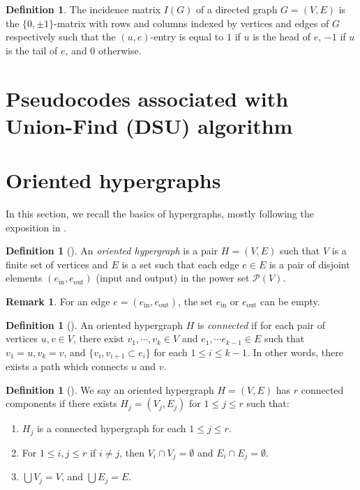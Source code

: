 \documentclass{article}
\theoremstyle{definition}
\newtheorem{definition}[theorem]{Definition}
\newtheorem{remark}[theorem]{Remark}
\begin{document}
\begin{definition}
The incidence matrix $I(G)$ of a directed graph $G=(V, E)$ is the $\{0, \pm 1\}$-matrix with rows and columns indexed by vertices and edges of $G$ respectively such that the $(u, e)$-entry is equal to $1$ if $u$ is the head of $e$,
 $-1$ if $u$ is the tail of $e$,
 and $0$ otherwise.
\end{definition}

\section{Pseudocodes associated with Union-Find (DSU) algorithm}\label{appdx_codes}






\section{Oriented hypergraphs}\label{appdx_hg}
In this section, we recall the basics of hypergraphs, mostly following the exposition in \cite{MR4236395}.

\begin{definition}[\cite{MR4236395}]
An \emph{oriented hypergraph} is a pair $H=(V, E)$ such that $V$ is a finite set of vertices and $E$ is a set such that each edge $e\in E$ is a pair of disjoint elements $(e_{\mathrm{in}}, e_{\mathrm{out}})$ (input and output) in the power set $\mathcal{P}(V)$.
\end{definition}

\begin{remark}
For an edge $e=(e_{\mathrm{in}}, e_{\mathrm{out}})$,
the set $e_{\mathrm{in}}$ or $e_{\mathrm{out}}$ can be empty.
\end{remark}

\begin{definition}[\cite{MR4236395}]
An oriented hypergraph $H$ is \emph{connected} if for each pair of vertices $u, v\in V$,
there exist $v_1, \cdots, v_k\in V$ and $e_1, \cdots e_{k-1}\in E$ such that $v_1=u, v_k=v$,
and $\{v_i, v_{i+1}\subset e_i\}$ for each $1\leq i\leq k-1$.
In other words,
there exists a path which connects $u$ and $v$.
\end{definition}

\begin{definition}[\cite{MR4236395}]
We say an oriented hypergraph $H=(V, E)$ has $r$ connected components if there exists $H_j=(V_j, E_j)$ for $1\leq j\leq r$ such that:
\begin{enumerate}
    \item $H_j$ is a connected hypergraph for each $1\leq j\leq r$.
    \item For $1\leq i, j\leq r$ if $i\neq j$, 
    then $V_i\cap V_j=\emptyset$ and $E_i\cap E_j=\emptyset$.
    \item $\bigcup V_j = V$,
    and $\bigcup E_j=E$.
\end{enumerate}
\end{definition}
\end{document}
